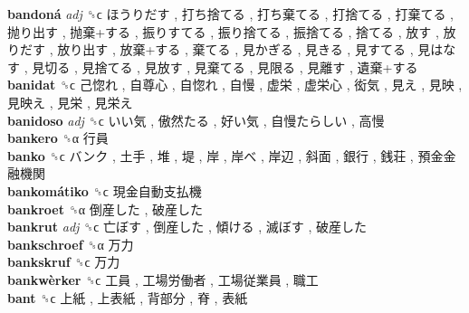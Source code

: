 \textbf{bandoná} \emph{adj}  ␝ϲ   ほうりだす ,  打ち捨てる ,  打ち棄てる ,  打捨てる ,  打棄てる ,  抛り出す ,  抛棄+する ,  振りすてる ,  振り捨てる ,  振捨てる ,  捨てる ,  放す ,  放りだす ,  放り出す ,  放棄+する ,  棄てる ,  見かぎる ,  見きる ,  見すてる ,  見はなす ,  見切る ,  見捨てる ,  見放す ,  見棄てる ,  見限る ,  見離す ,  遺棄+する   \\
\textbf{banidat} ␝ϲ   己惚れ ,  自尊心 ,  自惚れ ,  自慢 ,  虚栄 ,  虚栄心 ,  衒気 ,  見え ,  見映 ,  見映え ,  見栄 ,  見栄え   \\
\textbf{banidoso} \emph{adj}  ␝ϲ   いい気 ,  傲然たる ,  好い気 ,  自慢たらしい ,  高慢   \\
\textbf{bankero} ␝α   行員   \\
\textbf{banko} ␝ϲ   バンク ,  土手 ,  堆 ,  堤 ,  岸 ,  岸べ ,  岸辺 ,  斜面 ,  銀行 ,  銭荘 ,  預金金融機関   \\
\textbf{bankomátiko} ␝ϲ   現金自動支払機   \\
\textbf{bankroet} ␝α   倒産した ,  破産した   \\
\textbf{bankrut} \emph{adj}  ␝ϲ   亡ぼす ,  倒産した ,  傾ける ,  滅ぼす ,  破産した   \\
\textbf{bankschroef} ␝α   万力   \\
\textbf{bankskruf} ␝ϲ   万力   \\
\textbf{bankwèrker} ␝ϲ   工員 ,  工場労働者 ,  工場従業員 ,  職工   \\
\textbf{bant} ␝ϲ   上紙 ,  上表紙 ,  背部分 ,  脊 ,  表紙   \\
